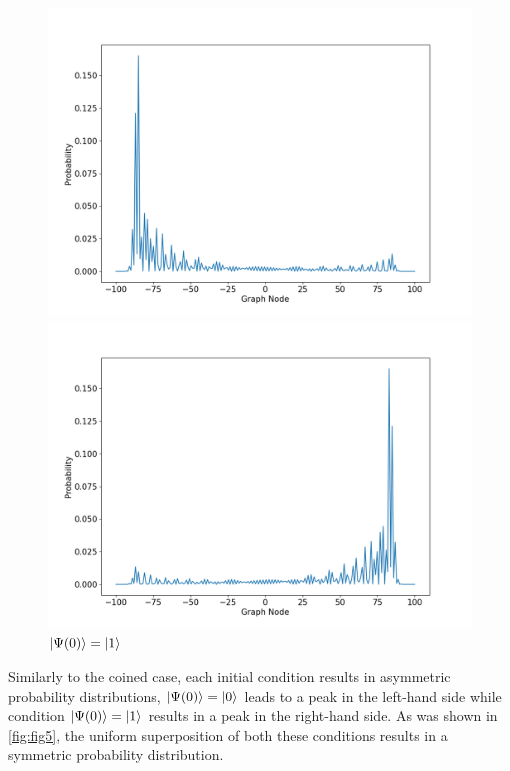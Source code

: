 \documentclass[../../dissertation.tex]{subfiles}
\begin{document}
\begin{figure}[!h]
	\includegraphics[width=\linewidth]{img/StagQuantumWalk/stagqwSingle0.png}
	\caption{$\ket{\Psi(0)}=\ket{0}$}\label{fig:fig6}
	\endminipage\hfill
	\includegraphics[width=\linewidth]{img/StagQuantumWalk/stagqwSingle1.png}
	\caption{$\ket{\Psi(0)}=\ket{1}$}\label{fig:fig7}
	\endminipage\hfill
\end{figure}

Similarly to the coined case, each initial condition results in asymmetric probability distributions, $\ket{\Psi(0)}=\ket{0}$ leads to a peak  in the left-hand side while condition $\ket{\Psi(0)}=\ket{1}$ results in a peak in the right-hand side. As was shown in \ref{fig:fig5}, the uniform superposition of both these conditions results in a symmetric probability distribution.
\end{document}
